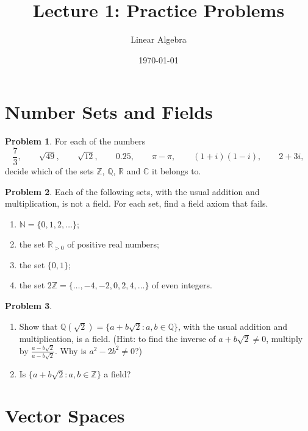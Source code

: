 \documentclass[11pt]{article}
\title{Lecture 1: Practice Problems}
\author{Linear Algebra}
\date{\today}
\theoremstyle{definition}
\newtheorem{problem}{Problem}[section]
\begin{document}
\maketitle

\section{Number Sets and Fields}

\begin{problem}\label{pr:numbers}
    For each of the numbers
    \[\frac{7}{3}, \qquad \sqrt{49}, \qquad \sqrt{12}, \qquad 0.25, \qquad \pi - \pi, \qquad (1 + i)(1 - i), \qquad 2 + 3i,\]
    decide which of the sets $\mathbb{Z}$, $\mathbb{Q}$, $\mathbb{R}$ and $\mathbb{C}$ it belongs to.
\end{problem}

\begin{problem}\label{pr:field-fail}
    Each of the following sets, with the usual addition and multiplication, is not a field. For each set, find a field axiom that fails.
    \begin{enumerate}[label=(\alph*)]
        \item $\mathbb{N} = \{0, 1, 2, \ldots\}$;
        \item the set $\mathbb{R}_{>0}$ of positive real numbers;
        \item the set $\{0, 1\}$;
        \item the set $2\mathbb{Z} = \{\ldots, -4, -2, 0, 2, 4, \ldots\}$ of even integers.
    \end{enumerate}
\end{problem}

\begin{problem}\label{pr:Qsqrt2}
    \begin{enumerate}[label=(\alph*)]
        \item Show that $\mathbb{Q}(\sqrt{2}) = \{a + b\sqrt{2} : a, b \in \mathbb{Q}\}$, with the usual addition and multiplication, is a field. (Hint: to find the inverse of $a + b\sqrt{2} \neq 0$, multiply by $\frac{a - b\sqrt{2}}{a - b\sqrt{2}}$. Why is $a^2 - 2b^2 \neq 0$?)
        \item Is $\{a + b\sqrt{2} : a, b \in \mathbb{Z}\}$ a field?
    \end{enumerate}
\end{problem}

\section{Vector Spaces}
\end{document}
